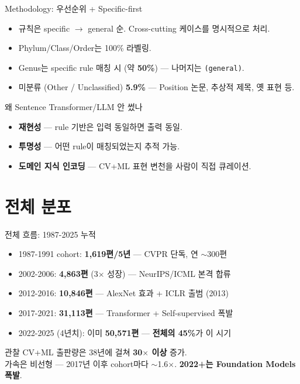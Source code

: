 \documentclass[aspectratio=169,t]{beamer}
\newcommand{\hot}[1]{\textcolor{accentorange}{\textbf{#1}}}
\newcommand{\cool}[1]{\textcolor{accentblue}{\textbf{#1}}}
\begin{document}
\begin{frame}{Methodology: 우선순위 + Specific-first}
\begin{itemize}
  \item 규칙은 specific $\to$ general 순. Cross-cutting 케이스를 명시적으로 처리.
  \item Phylum/Class/Order는 100\% 라벨링.
  \item Genus는 specific rule 매칭 시 (약 \hot{50\%}) — 나머지는 \texttt{(general)}.
  \item 미분류 (Other / Unclassified) \hot{5.9\%} — Position 논문, 추상적 제목, 옛 표현 등.
\end{itemize}
\vfill
\begin{block}{왜 Sentence Transformer/LLM 안 썼나}
\small
\begin{itemize}
\item \cool{재현성} — rule 기반은 입력 동일하면 출력 동일.
\item \cool{투명성} — 어떤 rule이 매칭되었는지 추적 가능.
\item \cool{도메인 지식 인코딩} — CV+ML 표현 변천을 사람이 직접 큐레이션.
\end{itemize}
\end{block}
\end{frame}

\section{전체 분포}


\begin{frame}{전체 흐름: 1987-2025 누적}
\begin{itemize}
  \item 1987-1991 cohort: \cool{1{,}619편/5년} — CVPR 단독, 연 ${\sim}300$편
  \item 2002-2006: \hot{4{,}863편} (3$\times$ 성장) — NeurIPS/ICML 본격 합류
  \item 2012-2016: \hot{10{,}846편} — AlexNet 효과 + ICLR 출범 (2013)
  \item 2017-2021: \hot{31{,}113편} — Transformer + Self-supervised 폭발
  \item 2022-2025 (4년치): 이미 \hot{50{,}571편} — \cool{전체의 45\%}가 이 시기
\end{itemize}
\vfill
\begin{block}{관찰}
\small CV+ML 출판량은 38년에 걸쳐 \hot{30$\times$ 이상} 증가. \\
가속은 비선형 — 2017년 이후 cohort마다 $\sim$1.6$\times$. \cool{2022+는 Foundation Models 폭발}.
\end{block}
\end{frame}
\end{document}
